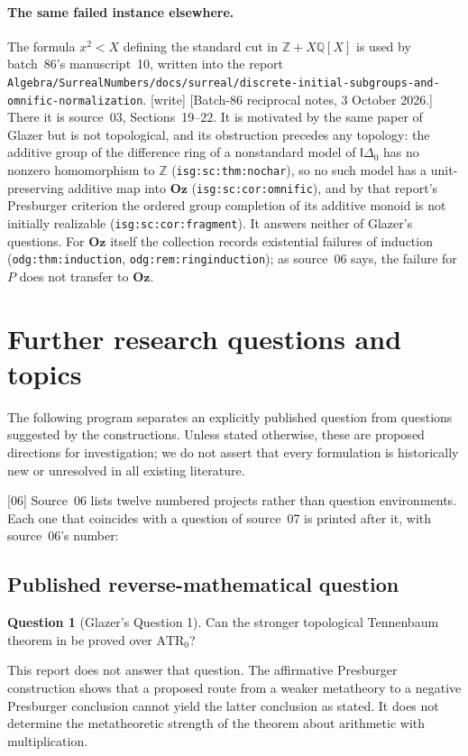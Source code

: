 \documentclass[11pt]{article}
\numberwithin{equation}{section}
\theoremstyle{definition}
\newtheorem{question}[question]{Question}
\theoremstyle{remark}
\newcommand{\Z}{\mathbb Z}
\newcommand{\Q}{\mathbb Q}
\newcommand{\Oz}{\mathbf{Oz}}
\newcommand{\src}[1]{\textup{\textsf{\small[#1]}}}
\newcommand{\writetag}{\textup{\textsf{\small[write]}}}
\newcommand{\replabel}[1]{\nolinkurl{#1}}
\newcommand{\fn}[1]{\nolinkurl{#1}}
\begin{document}
\paragraph{The same failed instance elsewhere.} The formula $x^2<X$ defining
the standard cut in $\Z+X\Q[X]$ is used by batch~86's manuscript~10, written
into the report
\fn{Algebra/SurrealNumbers/docs/surreal/discrete-initial-subgroups-and-omnific-normalization}.
\writetag{} [Batch-86 reciprocal notes, 3 October 2026.] There it is
source~03, Sections~19--22. It is motivated by the same paper of Glazer but
is not topological, and its obstruction precedes any topology: the additive
group of the difference ring of a nonstandard model of $\mathsf I\Delta_0$
has no nonzero homomorphism to $\Z$ (\replabel{isg:sc:thm:nochar}), so no
such model has a unit-preserving additive map into $\Oz$
(\replabel{isg:sc:cor:omnific}), and by that report's Presburger criterion
the ordered group completion of its additive monoid is not initially
realizable (\replabel{isg:sc:cor:fragment}). It answers neither of Glazer's
questions.
For $\Oz$ itself the collection records existential failures of induction
(\replabel{odg:thm:induction}, \replabel{odg:rem:ringinduction}); as source~06
says, the failure for $P$ does not transfer to $\Oz$.

\section{Further research questions and topics}
\label{pma:cp:sec:questions}

The following program separates an explicitly published question from
questions suggested by the constructions. Unless stated otherwise, these
are proposed directions for investigation; we do not assert that every
formulation is historically new or unresolved in all existing literature.

\noindent\src{06} Source~06 lists twelve numbered projects rather than
question environments. Each one that coincides with a question of source~07
is printed after it, with source~06's number:

\subsection{Published reverse-mathematical question}

\begin{question}[Glazer's Question 1]
Can the stronger topological Tennenbaum theorem in \cite{Glazer} be
proved over $\mathrm{ATR}_0$?
\end{question}
This report does not answer that question. The affirmative Presburger
construction shows that a proposed route from a weaker metatheory to a
negative Presburger conclusion cannot yield the latter conclusion as
stated. It does not determine the metatheoretic strength of the theorem
about arithmetic with multiplication.
\end{document}
